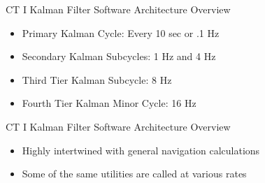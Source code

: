 \begin{frame}
CT I Kalman Filter Software Architecture Overview
\begin{itemize}
  \item Primary Kalman Cycle: Every 10 sec or .1 Hz
  \item Secondary Kalman Subcycles: 1 Hz and 4 Hz
  \item Third Tier Kalman Subcycle: 8 Hz
  \item Fourth Tier Kalman Minor Cycle: 16 Hz
\end{itemize} 
\end{frame}

\begin{frame}
CT I Kalman Filter Software Architecture Overview
\begin{itemize}
  \item Highly intertwined with general navigation calculations
  \item Some of the same utilities are called at various rates
\end{itemize} 
\end{frame}
